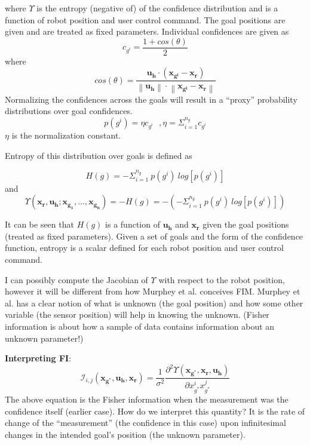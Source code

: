 \documentclass[]{article}
\newcommand{\norm}[1]{\left\lVert#1\right\rVert}
\begin{document}
where $\Upsilon$ is the entropy (negative of) of the confidence distribution and is a function of robot position and user control command. The goal positions are given and are treated as fixed parameters. 
Individual confidences are given as 
\begin{equation*}
c_{g^i} = \frac{1 + cos(\theta)}{2}
\end{equation*}
where 
\begin{equation*}
cos(\theta) = \frac{\boldsymbol{u_h}\cdot(\boldsymbol{x_{g^i}} - \boldsymbol{x_r})}{\norm{\boldsymbol{u_h}}\cdot\norm{\boldsymbol{x_{g^i}} - \boldsymbol{x_r}}}
\end{equation*}
Normalizing the confidences across the goals will result in a ``proxy'' probability distributions over goal confidences. 
\begin{equation*}
p(g^i) = \eta c_{g^i} ~~~,  \eta = \Sigma_{i = 1}^{n_g} c_{g^i}
\end{equation*}
$\eta$ is the normalization constant. 

Entropy of this distribution over goals is defined as 

\begin{equation*}
H(g) = -\Sigma_{i = 1}^{n_g}~p(g^i)~log[p(g^i)]
\end{equation*}
and
\begin{equation*}
\Upsilon(\boldsymbol{x_r}, \boldsymbol{u_h}; \boldsymbol{x_{g_1}},\dots,\boldsymbol{x_{g_n}}) = -H(g) = -(-\Sigma_{i = 1}^{n_g}~p(g^i)~log[p(g^i)])
\end{equation*}

It can be seen that $H(g)$ is a function of $\boldsymbol{u_h}$ and $\boldsymbol{x_r}$ given the goal positions (treated as fixed parameters). Given a set of goals and the form of the confidence function, entropy is a scalar defined for each robot position and user control command. 

I can possibly compute the Jacobian of $\Upsilon$ with respect to the robot position, however it will be different from how Murphey et al. conceives FIM. Murphey et al. has a clear notion of what is unknown (the goal position) and how some other variable (the sensor position) will help in knowing the unknown. (Fisher information is about how a sample of data contains information about an unknown parameter!)

\noindent\textbf{Interpreting FI}:
\begin{equation*}
\mathcal{I}_{i,j}(\boldsymbol{x_{g^*}}, \boldsymbol{u_h}, \boldsymbol{x_r}) = \frac{1}{\sigma^2}\frac{\partial^2\Upsilon(\boldsymbol{x_{g^*}}, \boldsymbol{x_r}, \boldsymbol{u_h})}{\partial x_{g^*}^ix_{g^*}^j}
\end{equation*}
The above equation is the Fisher information when the measurement was the confidence itself (earlier case). How do we interpret this quantity? It is the rate of change of the ``measurement'' (the confidence in this case) upon infinitesimal changes in the intended goal's position (the unknown parameter).
\end{document}
